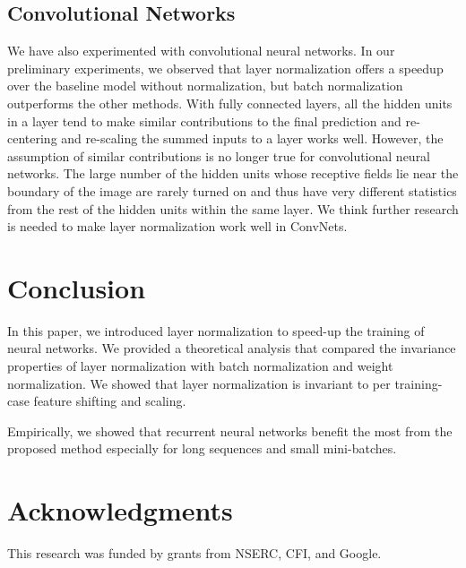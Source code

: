 \documentclass{article}
\begin{document}
\subsection{Convolutional Networks}
\label{sec:convnets}

We have also experimented with convolutional neural networks. In our preliminary experiments, we observed that layer normalization offers a speedup over the baseline model without normalization, but batch normalization outperforms the other methods. With fully connected layers, all the hidden units in a layer tend to make similar contributions to the final prediction and re-centering and re-scaling the summed inputs to a layer works well.  However, the assumption of similar contributions is no longer true for convolutional neural networks. The large number of the hidden units whose receptive fields lie near the boundary of the image are rarely turned on and thus have very different statistics from the rest of the hidden units within the same layer. We think further research is needed to make layer normalization work well in ConvNets.

\section{Conclusion}
\label{sec:discussion}

In this paper, we introduced layer normalization to speed-up the  training of neural networks. We provided a theoretical analysis that compared the invariance properties of layer normalization with batch normalization and weight normalization. We showed that layer normalization is invariant to per training-case feature shifting and scaling.

Empirically, we showed that recurrent neural networks benefit the most from the proposed method especially for long sequences and small mini-batches. 

\section*{Acknowledgments}   
\vspace{-0.1in}
This research was funded by grants from NSERC, CFI, and Google.

\pagebreak
\setlength{\bibsep}{5pt plus 0.3ex}
\begin{small}
\vspace{-0.1in}

\end{small}

\newpage
\end{document}
